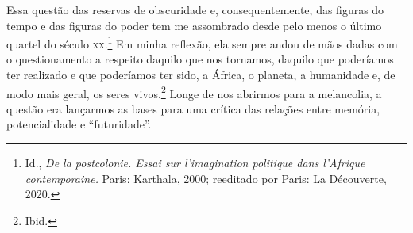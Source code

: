 \begin{multicols}{2}
Essa questão das reservas de obscuridade e, consequentemente, das
figuras do tempo e das figuras do poder tem me assombrado desde pelo
menos o último quartel do século \textsc{xx}.\footnote{Id., \textit{De la
  postcolonie. Essai sur l'imagination politique dans l'Afrique
  contemporaine.} Paris: Karthala, 2000; reeditado por Paris: La
  Découverte, 2020.} Em minha reflexão, ela sempre andou de mãos dadas
com o questionamento a respeito daquilo que nos tornamos, daquilo que
poderíamos ter realizado e que poderíamos ter sido, a África, o planeta,
a humanidade e, de modo mais geral, os seres vivos.\footnote{Ibid.}
Longe de nos abrirmos para a melancolia, a questão era lançarmos as
bases para uma crítica das relações entre memória, potencialidade e
``futuridade''.

\noindent{}\textcolor{gray}{\footnotesize{}}
\end{multicols}


\pagebreak
\pagestyle{n-1cat}

